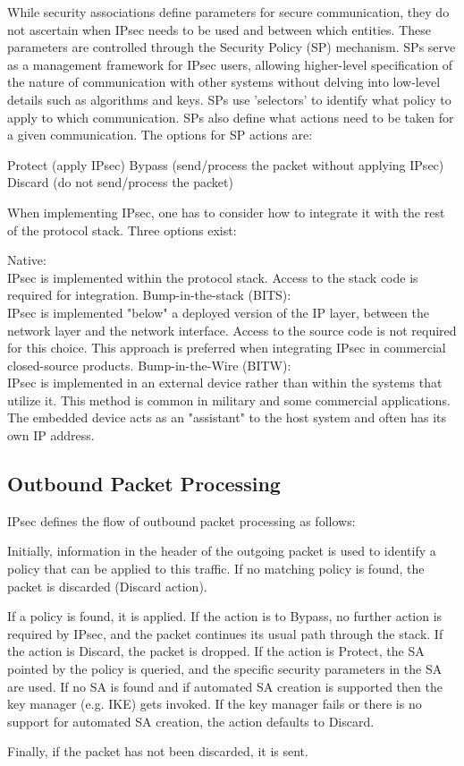 While security associations define parameters for secure communication, they do not ascertain when IPsec needs to be used and between which entities. These parameters are controlled through the Security Policy (SP) mechanism. SPs serve as a management framework for IPsec users, allowing higher-level specification of the nature of communication with other systems without delving into low-level details such as algorithms and keys. SPs use 'selectors' to identify what policy to apply to which communication. SPs also define what actions need to be taken for a given communication. The options for SP actions are:
\begin{outline}
    \1 Protect (apply IPsec)
    \1 Bypass (send/process the packet without applying IPsec)
    \1 Discard (do not send/process the packet)
\end{outline}

When implementing IPsec, one has to consider how to integrate it with the rest of the protocol stack. Three options exist:
\begin{outline}
\1 Native:\\
IPsec is implemented within the protocol stack. Access to the stack code is required for integration.
\1 Bump-in-the-stack (BITS):\\
IPsec is implemented "below" a deployed version of the IP layer, between the network layer and the network interface. Access to the source code is not required for this choice. This approach is preferred when integrating IPsec in commercial closed-source products.
\1 Bump-in-the-Wire (BITW):\\
IPsec is implemented in an external device rather than within the systems that utilize it. This method is common in military and some commercial applications. The embedded device acts as an "assistant" to the host system and often has its own IP address.
\end{outline}

\subsection{Outbound Packet Processing}
IPsec defines the flow of outbound packet processing as follows:
\begin{outline}

\1 Initially, information in the header of the outgoing packet is used to identify a policy that can be applied to this traffic. If no matching policy is found, the packet is discarded (Discard action).

\1 If a policy is found, it is applied. If the action is to Bypass, no further action is required by IPsec, and the packet continues its usual path through the stack. If the action is Discard, the packet is dropped. If the action is Protect, the SA pointed by the policy is queried, and the specific security parameters in the SA are used. If no SA is found and if automated SA creation is supported then the key manager (e.g. IKE) gets invoked. If the key manager fails or there is no support for automated SA creation, the action defaults to Discard.

\1 Finally, if the packet has not been discarded, it is sent.
\end{outline}

